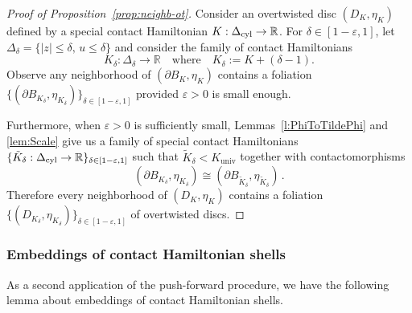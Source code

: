 \documentclass[12pt]{paper}
\theoremstyle{plain}
\theoremstyle{definition}
\newcommand{\p}{\partial}
\newcommand{\eps}{\varepsilon}
\newcommand{\abs}[1]{\left| #1 \right|}
\newcommand{\R}{{\mathbb{R}}}
\newcommand{\cyl}{{\rm cyl}}
\newcommand{\univ}{\mathrm{univ}}
\numberwithin{figure}{section}
\begin{document}
\begin{proof}[Proof of Proposition~\ref{prop:neighb-ot}]
	Consider an overtwisted disc $(D_{K}, \eta_{K})$ defined by a special contact Hamiltonian $K: \Delta_{\cyl} \to \R$.  
	For $\delta \in [1-\eps, 1]$, let $\Delta_\delta = \{\abs{z} \leq \delta,\, u \leq \delta\}$
	and consider the family of contact Hamiltonians
	$$
		K_{\delta}: \Delta_\delta \to \R \quad\mbox{where}\quad K_{\delta}:= K + (\delta - 1).
	$$	
	Observe any neighborhood of $(\p B_{K}, \eta_{K})$ contains
	a foliation $\{(\p B_{K_{\delta}}, \eta_{K_{\delta}})\}_{\delta \in [1-\eps, 1]}$ provided
	$\eps > 0$ is small enough.
	
	Furthermore, when $\eps > 0$ is sufficiently small, Lemmas~\ref{l:PhiToTildePhi} and \ref{lem:Scale} give us
	a family of special contact Hamiltonians
	$\{\tilde{K}_\delta: \Delta_{\cyl} \to \R\}_{\delta \in [1-\eps, 1]}$ such that
	$\tilde{K}_\delta < K_\univ$ together with contactomorphisms
	$$
		(\p B_{K_{\delta}}, \eta_{K_{\delta}}) \cong (\p B_{\tilde{K}_{\delta}}, \eta_{\tilde{K}_{\delta}})\,.
	$$
	Therefore every neighborhood of $(D_{K}, \eta_{K})$ contains a foliation
	$\{(D_{K_{\delta}}, \eta_{K_{\delta}})\}_{\delta \in [1-\eps, 1]}$ of overtwisted discs.
\end{proof}

\subsubsection{Embeddings of contact Hamiltonian shells}

As a second application of the push-forward procedure, we have the following lemma about embeddings of contact Hamiltonian shells.
\end{document}
